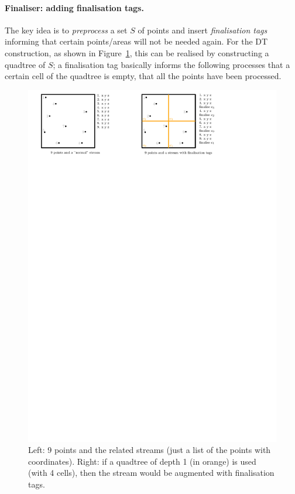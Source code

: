 \paragraph{Finaliser: adding finalisation tags.}
The key idea is to \emph{preprocess} a set $S$ of points and insert \emph{finalisation tags} informing that certain points/areas will not be needed again.
For the DT construction, as shown in Figure~\ref{fig:finaliser}, this can be realised by constructing a quadtree of $S$; a finalisation tag basically informs the following processes that a certain cell of the quadtree is empty, that all the points have been processed.
\begin{figure}
  \centering
  \includegraphics[width=\linewidth]{figs/finaliser}
  \caption{Left: 9 points and the related streams (just a list of the points with coordinates). Right: if a quadtree of depth 1 (in orange) is used (with 4 cells), then the stream would be augmented with finalisation tags.}%
\label{fig:finaliser}
\end{figure}


